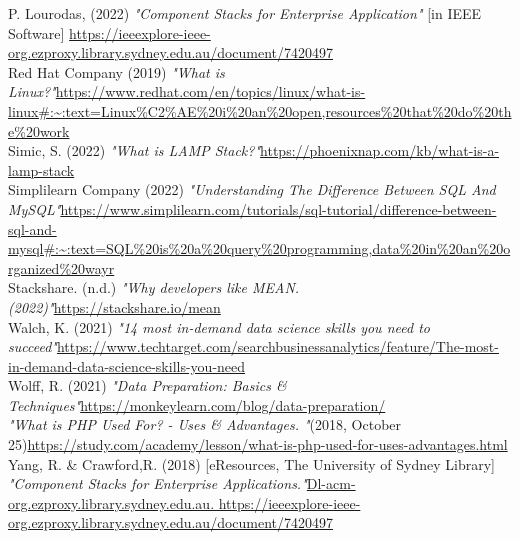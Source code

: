 \documentclass[a4paper, 11pt]{report}
\begin{document}
{P. Lourodas,  (2022)  \emph{"Component Stacks for Enterprise Application"} [in IEEE Software] {\url{https://ieeexplore-ieee-org.ezproxy.library.sydney.edu.au/document/7420497}}}\\

{Red Hat Company (2019)  \emph{"What is Linux?"}{\url{https://www.redhat.com/en/topics/linux/what-is-linux\#:~:text=Linux\%C2\%AE\%20i\%20an\%20open,resources\%20that\%20do\%20the\%20work}}}\\

{Simic,  S.  (2022)  \emph{"What is LAMP Stack?"}{\url{https://phoenixnap.com/kb/what-is-a-lamp-stack}}}\\

{Simplilearn Company (2022)  \emph{"Understanding The Difference Between SQL And MySQL"}{\url{https://www.simplilearn.com/tutorials/sql-tutorial/difference-between-sql-and-mysql\#:~:text=SQL\%20is\%20a\%20query\%20programming,data\%20in\%20an\%20organized\%20wayr}}}\\

{Stackshare.  (n.d.)  \emph{"Why developers like MEAN. (2022)"}{\url{https://stackshare.io/mean}}}\\

{Walch,  K.  (2021)  \emph{"14 most in-demand data science skills you need to succeed"}{\url{https://www.techtarget.com/searchbusinessanalytics/feature/The-most-in-demand-data-science-skills-you-need}}}\\

{Wolff,  R.  (2021)  \emph{"Data Preparation: Basics \& Techniques"}{\url{https://monkeylearn.com/blog/data-preparation/}}}\\

{ \emph{"What is PHP Used For? - Uses \& Advantages. "}(2018, October 25){\url{https://study.com/academy/lesson/what-is-php-used-for-uses-advantages.html}}}\\

{Yang,  R.  \& Crawford,R.  (2018) [eResources,  The University of Sydney Library]  \emph{"Component Stacks for Enterprise Applications."}{\url{Dl-acm-org.ezproxy.library.sydney.edu.au.  https://ieeexplore-ieee-org.ezproxy.library.sydney.edu.au/document/7420497}}}\\
\end{document}
